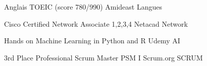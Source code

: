 


\begin{cvhonors}

  \cvhonor
    {} %
    {\hspace{1mm} Anglais TOEIC (score 780/990)} %
    {Amideast} %
    {Langues} %

  \cvhonor
    {} %
    {\hspace{1mm} Cisco Certified Network Associate 1,2,3,4 } %
    {Netacad} %
    {Network} %

  \cvhonor
    {} %
    {\hspace{1mm}Hands on Machine Learning in Python and R} %
    {Udemy} %
    {AI} %

  \cvhonor
    {3rd Place} %
    {\hspace{1mm}Professional Scrum Master PSM I } %
    {Scrum.org} %
    {SCRUM} %

\end{cvhonors}


